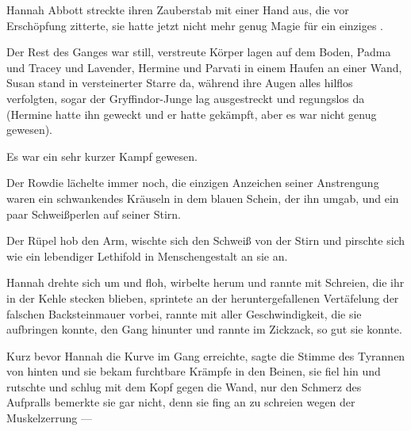 \later

Hannah Abbott streckte ihren Zauberstab mit einer Hand aus, die vor Erschöpfung zitterte, sie hatte jetzt nicht mehr genug Magie für ein einziges .

Der Rest des Ganges war still, verstreute Körper lagen auf dem Boden, Padma und Tracey und Lavender, Hermine und Parvati in einem Haufen an einer Wand, Susan stand in versteinerter Starre da, während ihre Augen alles hilflos verfolgten, sogar der Gryffindor-Junge lag ausgestreckt und regungslos da (Hermine hatte ihn geweckt und er hatte gekämpft, aber es war nicht genug gewesen).

Es war ein sehr kurzer Kampf gewesen.

Der Rowdie lächelte immer noch, die einzigen Anzeichen seiner Anstrengung waren ein schwankendes Kräuseln in dem blauen Schein, der ihn umgab, und ein paar Schweißperlen auf seiner Stirn.

Der Rüpel hob den Arm, wischte sich den Schweiß von der Stirn und pirschte sich wie ein lebendiger Lethifold in Menschengestalt an sie an.

Hannah drehte sich um und floh, wirbelte herum und rannte mit Schreien, die ihr in der Kehle stecken blieben, sprintete an der heruntergefallenen Vertäfelung der falschen Backsteinmauer vorbei, rannte mit aller Geschwindigkeit, die sie aufbringen konnte, den Gang hinunter und rannte im Zickzack, so gut sie konnte.

Kurz bevor Hannah die Kurve im Gang erreichte, sagte die Stimme des Tyrannen von hinten  und sie bekam furchtbare Krämpfe in den Beinen, sie fiel hin und rutschte und schlug mit dem Kopf gegen die Wand, nur den Schmerz des Aufpralls bemerkte sie gar nicht, denn sie fing an zu schreien wegen der Muskelzerrung —

